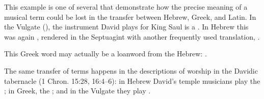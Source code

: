 This example is one of several that demonstrate how the precise meaning of a
musical term could be lost in the transfer between Hebrew, Greek, and Latin.
In the Vulgate (), the instrument David plays for King
Saul is a .
In Hebrew this was again , rendered in the Septuagint with another
frequently used translation, .%
\begin{Footnote}
    This Greek word may actually be a loanword from the Hebrew:
    \autocite[]{Brown:HebrewOTLexicon}.
\end{Footnote}
The same transfer of terms happens in the descriptions of worship in the Davidic
tabernacle (1 Chron. 15:28, 16:4--6): in Hebrew David's temple musicians play
the ; in Greek, the ; and in the Vulgate they
play .


